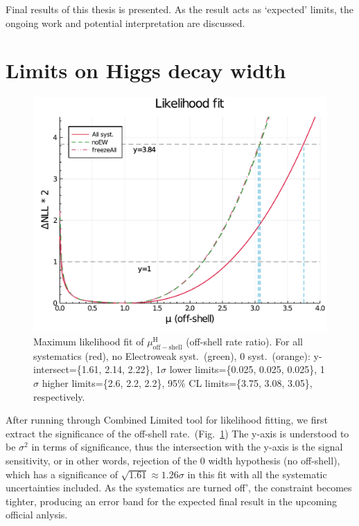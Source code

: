 Final results of this thesis is presented. As the result acts as
`expected' limits, the ongoing work and potential interpretation are discussed.
\pagebreak
\section{Limits on Higgs decay width}
\begin{figure}[htb]
    \centering
    \includegraphics[width=.8\linewidth]{fig/Final_fit_mu_offshell.pdf}
    \caption{Maximum likelihood fit of $\mu^\mathrm{H}_\mathrm{off-shell}$ (off-shell rate ratio).
    For all systematics (red), no Electroweak syst.~(green),
    0 syst.~(orange): y-intersect=\{1.61, 2.14, 2.22\}, 1$\sigma$ lower limits=\{0.025, 0.025, 0.025\},
1$\sigma$ higher limits=\{2.6, 2.2, 2.2\}, 95\% CL limits=\{3.75, 3.08, 3.05\}, respectively.}
    \label{fig:final_fit_mu}
\end{figure}
After running through Combined Limited tool for likelihood fitting, we first extract the significance
of the off-shell rate.~(Fig.~\ref{fig:final_fit_mu})
The y-axis is understood to be $\sigma^2$ in terms of significance, thus
the intersection with the y-axis is the signal sensitivity, or in other words,
rejection of the 0 width hypothesis (no off-shell), which has a significance of 
$\sqrt{1.61} \approx 1.26\sigma$ in this fit with all the systematic uncertainties included.
As the systematics are turned off', the constraint becomes tighter, producing an error band for the expected
final result in the upcoming official anlysis.

